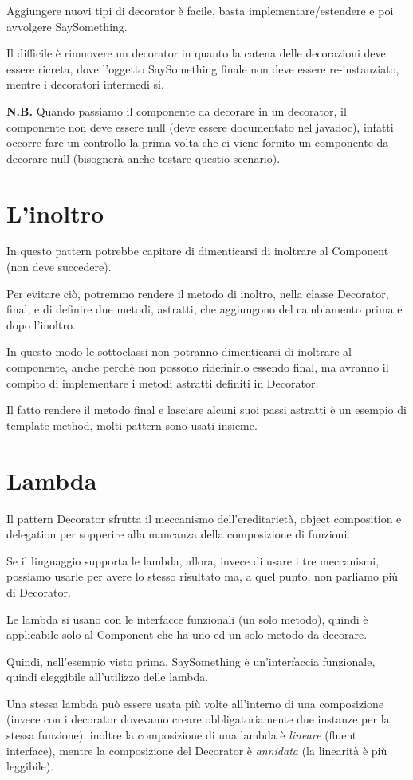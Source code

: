Aggiungere nuovi tipi di decorator è facile, basta implementare/estendere e poi avvolgere SaySomething.

Il difficile è rimuovere un decorator in quanto la catena delle decorazioni deve essere ricreta, dove l'oggetto SaySomething finale non deve essere re-instanziato, 
mentre i decoratori intermedi si.

\medskip
\textbf{N.B.} Quando passiamo il componente da decorare in un decorator, il componente non deve essere null (deve essere documentato nel javadoc), infatti occorre 
fare un controllo la prima volta che ci viene fornito un componente da decorare null (bisognerà anche testare questio scenario).

\section{L'inoltro}

In questo pattern potrebbe capitare di dimenticarsi di inoltrare al Component (non deve succedere).

Per evitare ciò, potremmo rendere il metodo di inoltro, nella classe Decorator, final, e di definire due metodi, astratti, che aggiungono del cambiamento prima e dopo 
l'inoltro.

In questo modo le sottoclassi non potranno dimenticarsi di inoltrare al componente, anche perchè non possono ridefinirlo essendo final, ma avranno il compito di 
implementare i metodi astratti definiti in Decorator.

Il fatto rendere il metodo final e lasciare alcuni suoi passi astratti è un esempio di template method, molti pattern sono usati insieme.

\section{Lambda}

Il pattern Decorator sfrutta il meccanismo dell'ereditarietà, object composition e delegation per sopperire alla mancanza della composizione di funzioni.

Se il linguaggio supporta le lambda, allora, invece di usare i tre meccanismi, possiamo usarle per avere lo stesso risultato ma, a quel punto, non parliamo più di 
Decorator.

Le lambda si usano con le interfacce funzionali (un solo metodo), quindi è applicabile solo al Component che ha uno ed un solo metodo da decorare.

Quindi, nell'esempio visto prima, SaySomething è un'interfaccia funzionale, quindi eleggibile all'utilizzo delle lambda.

Una stessa lambda può essere usata più volte all'interno di una composizione (invece con i decorator dovevamo creare obbligatoriamente due instanze per la stessa 
funzione), inoltre la composizione di una lambda è \textit{lineare} (fluent interface), mentre la composizione del Decorator è 
\textit{annidata} (la linearità è più leggibile).